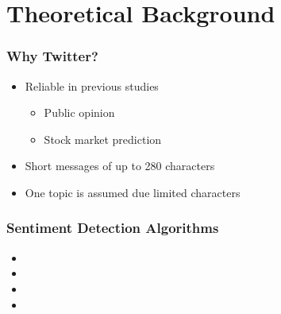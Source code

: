 
\section{Theoretical Background}

\begin{frame}
    \frametitle{Why Twitter?}

    \begin{itemize}
        \item Reliable in previous studies \citep{Barbosa2010}
        \begin{itemize}
            \item Public opinion \citep{Oconnor2010a,Patodkar2016a}
            \item Stock market prediction \citep{Bollen2011a,Mittal2012a,Nguyen2015a,Pagolu2016a,Zhang2011a}
        \end{itemize}

        \item Short messages of up to 280 characters \citep{Rosen2017}
        \item One topic is assumed due limited characters \citep{Pagolu2016a,Patodkar2016a}
    \end{itemize}
\end{frame}
  

\begin{frame}
    \frametitle{Sentiment Detection Algorithms}

    \begin{itemize}
        \item \tb{}
        \item \nb{}
        \item \me{}
        \item \svm{}
    \end{itemize}
\end{frame}


